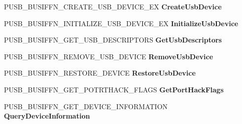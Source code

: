 \begin{DoxyCompactItemize}
P\+U\+S\+B\+\_\+\+B\+U\+S\+I\+F\+F\+N\+\_\+\+C\+R\+E\+A\+T\+E\+\_\+\+U\+S\+B\+\_\+\+D\+E\+V\+I\+C\+E\+\_\+\+EX {\bfseries Create\+Usb\+Device}
\item 
\mbox{\label{struct___u_s_b___b_u_s___i_n_t_e_r_f_a_c_e___h_u_b___v6_aad7db5e498b99d8631aeb39589791c45}} 
P\+U\+S\+B\+\_\+\+B\+U\+S\+I\+F\+F\+N\+\_\+\+I\+N\+I\+T\+I\+A\+L\+I\+Z\+E\+\_\+\+U\+S\+B\+\_\+\+D\+E\+V\+I\+C\+E\+\_\+\+EX {\bfseries Initialize\+Usb\+Device}
\item 
\mbox{\label{struct___u_s_b___b_u_s___i_n_t_e_r_f_a_c_e___h_u_b___v6_a7eb024f0d3cccad77e7ddac68b87291e}} 
P\+U\+S\+B\+\_\+\+B\+U\+S\+I\+F\+F\+N\+\_\+\+G\+E\+T\+\_\+\+U\+S\+B\+\_\+\+D\+E\+S\+C\+R\+I\+P\+T\+O\+RS {\bfseries Get\+Usb\+Descriptors}
\item 
\mbox{\label{struct___u_s_b___b_u_s___i_n_t_e_r_f_a_c_e___h_u_b___v6_ac61663b2159420c5e93f44cab94ff03d}} 
P\+U\+S\+B\+\_\+\+B\+U\+S\+I\+F\+F\+N\+\_\+\+R\+E\+M\+O\+V\+E\+\_\+\+U\+S\+B\+\_\+\+D\+E\+V\+I\+CE {\bfseries Remove\+Usb\+Device}
\item 
\mbox{\label{struct___u_s_b___b_u_s___i_n_t_e_r_f_a_c_e___h_u_b___v6_aa292cbd3992f47f04bce3a7e357ed8da}} 
P\+U\+S\+B\+\_\+\+B\+U\+S\+I\+F\+F\+N\+\_\+\+R\+E\+S\+T\+O\+R\+E\+\_\+\+D\+E\+V\+I\+CE {\bfseries Restore\+Usb\+Device}
\item 
\mbox{\label{struct___u_s_b___b_u_s___i_n_t_e_r_f_a_c_e___h_u_b___v6_a83520cde9424eed73ada2b605b22c58f}} 
P\+U\+S\+B\+\_\+\+B\+U\+S\+I\+F\+F\+N\+\_\+\+G\+E\+T\+\_\+\+P\+O\+T\+R\+T\+H\+A\+C\+K\+\_\+\+F\+L\+A\+GS {\bfseries Get\+Port\+Hack\+Flags}
\item 
\mbox{\label{struct___u_s_b___b_u_s___i_n_t_e_r_f_a_c_e___h_u_b___v6_abe1594924f2547bca5f14aa6da36dbfc}} 
P\+U\+S\+B\+\_\+\+B\+U\+S\+I\+F\+F\+N\+\_\+\+G\+E\+T\+\_\+\+D\+E\+V\+I\+C\+E\+\_\+\+I\+N\+F\+O\+R\+M\+A\+T\+I\+ON {\bfseries Query\+Device\+Information}
\item 
\mbox{\label{struct___u_s_b___b_u_s___i_n_t_e_r_f_a_c_e___h_u_b___v6_a35ee812708bba132e1128d38697a07d6}} 

\end{DoxyCompactItemize}
